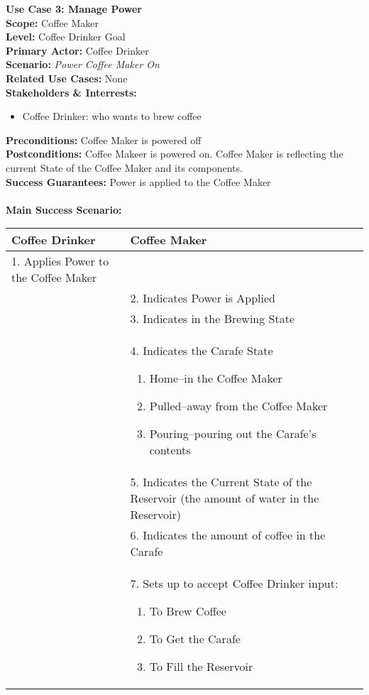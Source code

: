 \documentclass[letterpaper]{article}
\begin{document}
\noindent
\textbf{Use Case 3: Manage Power}\\
\textbf{Scope:  }Coffee Maker\\
\textbf{Level:  }Coffee Drinker Goal\\
\textbf{Primary Actor:  }Coffee Drinker\\
\textbf{Scenario: }\textit{Power Coffee Maker On}\\
\textbf{Related Use Cases:  }None\\
\textbf{Stakeholders \& Interrests:  }
\begin{itemize}
\item Coffee Drinker:  who wants to brew coffee
\end{itemize}
\textbf{Preconditions:  }Coffee Maker is powered off\\
\textbf{Postconditions:  }Coffee Makeer is powered on.  Coffee Maker
is reflecting the current State of the Coffee Maker and its
components.\\
\textbf{Success Guarantees:  }Power is applied to the Coffee Maker\\\\
\textbf{Main Success Scenario:  }\\
\begin{tabular}{|p{5.75cm}|p{5.75cm}|}\hline
\textbf{Coffee Drinker} & \textbf{Coffee Maker}\\\hline
1.  Applies Power to the Coffee Maker & \\\hline
& 2.  Indicates Power is Applied\\\hline
& 3.  Indicates in the Brewing State\\\hline
& 4.  Indicates the Carafe State
\begin{enumerate}
\item Home--in the Coffee Maker
\item Pulled--away from the Coffee Maker
\item Pouring--pouring out the Carafe's contents
\end{enumerate}
\\\hline
& 5.  Indicates the Current State of the Reservoir (the amount of
water in the Reservoir)\\\hline
& 6.  Indicates the amount of coffee in the Carafe\\\hline
& 7.  Sets up to accept Coffee Drinker input:
\begin{enumerate}
\item To Brew Coffee
\item To Get the Carafe
\item To Fill the Reservoir
\end{enumerate}
\\\hline
\end{tabular}\\\\
\end{document}
